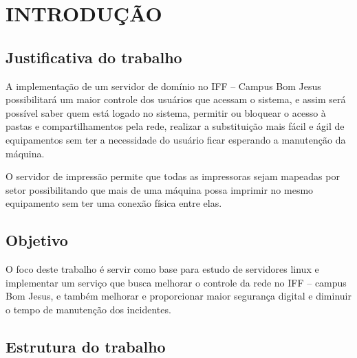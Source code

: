 \chapter{INTRODUÇÃO}

\section{Justificativa do trabalho}

A implementação de um servidor de domínio no IFF – Campus Bom Jesus possibilitará um maior controle dos usuários que acessam o sistema, e assim será possível saber quem está logado no sistema, permitir ou bloquear o acesso à pastas e compartilhamentos pela rede, realizar a substituição mais fácil e ágil de equipamentos sem ter a necessidade do usuário ficar esperando a manutenção da máquina.

O servidor de impressão permite que todas as impressoras sejam mapeadas por setor possibilitando que mais de uma máquina possa imprimir no mesmo equipamento sem ter uma conexão física entre elas.

\section{Objetivo}

O foco deste trabalho é servir como base para estudo de servidores linux e implementar um serviço que busca melhorar o controle da rede no IFF – campus Bom Jesus, e também melhorar e proporcionar maior segurança digital e diminuir o tempo de manutenção dos incidentes.

\section{Estrutura do trabalho}

